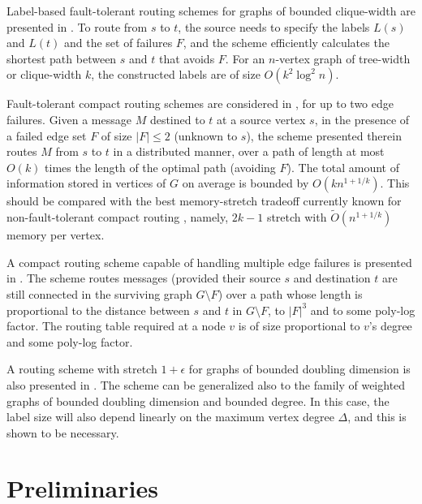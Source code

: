 \documentclass[12pt]{article}
\begin{document}
Label-based fault-tolerant routing schemes for graphs of
bounded clique-width are presented in \cite{CT07}.
To route from $s$ to $t$, the source needs to specify the labels
$L(s)$ and $L(t)$ and the set of failures $F$, and the scheme
efficiently calculates the shortest path between $s$ and $t$ that avoids $F$.
For an $n$-vertex graph of tree-width or clique-width $k$, the
constructed labels are of size $O(k^2 \log^2 n)$.
\par
Fault-tolerant compact routing schemes are considered
in \cite{CLPR09-do}, for up to two edge failures.
Given a message $M$ destined to $t$ at a source vertex $s$, in the
presence of a failed edge set $F$ of size $|F|\le 2$ (unknown to $s$),
the scheme presented therein routes $M$ from $s$ to $t$
in a distributed manner, over a path of length at most $O(k)$ times
the length of the optimal path (avoiding $F$).
The total amount of information stored in vertices of $G$
on average is bounded by $O(k n^{1+1/k})$.
This should be compared with the best memory-stretch tradeoff currently
known for non-fault-tolerant compact routing \cite{TZ01}, namely,
$2k-1$ stretch with ${\tilde O}(n^{1+1/k})$ memory per vertex.
\par
A compact routing scheme capable of handling multiple edge failures
is presented in \cite{S12}.
The scheme routes messages (provided their source $s$ and destination $t$
are still connected in the surviving graph $G \setminus F$)
over a path whose length is proportional to the distance between $s$ and $t$
in $G \setminus F$, to $|F|^3$ and to some poly-log factor.
The routing table required at a node $v$ is of size proportional to
$v$'s degree and some poly-log factor.
\par
A routing scheme with stretch $1+\epsilon$ for graphs of bounded
doubling dimension is also presented in \cite{ACGP10}.
The scheme can be generalized also to the family of weighted graphs
of bounded doubling dimension and bounded degree.
In this case, the label size will also depend linearly on the maximum
vertex degree $\Delta$, and this is shown to be necessary.

\section{Preliminaries}
\label{sec:prelim}
\end{document}
